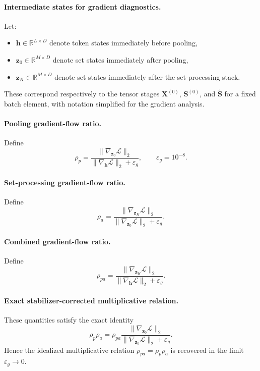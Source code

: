 \documentclass{article}
\theoremstyle{plain}
\theoremstyle{definition}
\theoremstyle{remark}
\begin{document}
\paragraph{Intermediate states for gradient diagnostics.}
Let:
\begin{itemize}
    \item $\mathbf h\in\mathbb R^{L\times D}$ denote token states immediately before pooling,
    \item $\mathbf z_0\in\mathbb R^{M\times D}$ denote set states immediately after pooling,
    \item $\mathbf z_K\in\mathbb R^{M\times D}$ denote set states immediately after the set-processing stack.
\end{itemize}
These correspond respectively to the tensor stages $\mathbf X^{(0)}$, $\mathbf S^{(0)}$, and $\widetilde{\mathbf S}$ for a fixed batch element, with notation simplified for the gradient analysis.

\paragraph{Pooling gradient-flow ratio.}
Define
\begin{equation}
\label{eq:rho-p}
\rho_p
=
\frac{\|\nabla_{\mathbf z_0}\mathcal L\|_2}{\|\nabla_{\mathbf h}\mathcal L\|_2+\varepsilon_g},
\qquad
\varepsilon_g=10^{-8}.
\end{equation}

\paragraph{Set-processing gradient-flow ratio.}
Define
\begin{equation}
\label{eq:rho-a}
\rho_a
=
\frac{\|\nabla_{\mathbf z_K}\mathcal L\|_2}{\|\nabla_{\mathbf z_0}\mathcal L\|_2+\varepsilon_g}.
\end{equation}

\paragraph{Combined gradient-flow ratio.}
Define
\begin{equation}
\label{eq:rho-pa}
\rho_{pa}
=
\frac{\|\nabla_{\mathbf z_K}\mathcal L\|_2}{\|\nabla_{\mathbf h}\mathcal L\|_2+\varepsilon_g}.
\end{equation}

\paragraph{Exact stabilizer-corrected multiplicative relation.}
These quantities satisfy the exact identity
\begin{equation}
\label{eq:rho-composition-corrected}
\rho_p\rho_a
=
\rho_{pa}
\frac{\|\nabla_{\mathbf z_0}\mathcal L\|_2}{\|\nabla_{\mathbf z_0}\mathcal L\|_2+\varepsilon_g}.
\end{equation}
Hence the idealized multiplicative relation $\rho_{pa}=\rho_p\rho_a$ is recovered in the limit $\varepsilon_g\to 0$.
\end{document}
